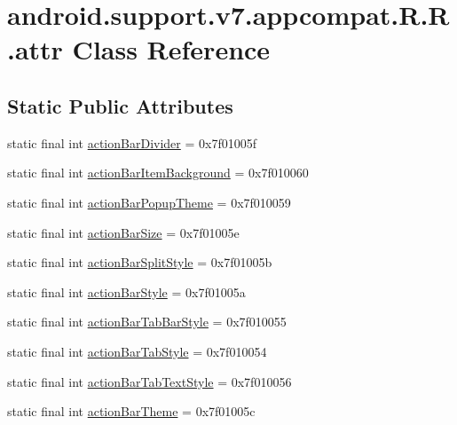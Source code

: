 \hypertarget{classandroid_1_1support_1_1v7_1_1appcompat_1_1_r_1_1attr}{
\section{android.support.v7.appcompat.R.R.attr Class Reference}
\label{classandroid_1_1support_1_1v7_1_1appcompat_1_1_r_1_1attr}
}
\subsection*{Static Public Attributes}
\begin{CompactItemize}
\item 
static final int \hyperlink{classandroid_1_1support_1_1v7_1_1appcompat_1_1_r_1_1attr_c9199392bf3e36a0efdac1749c98882b}{actionBarDivider} = 0x7f01005f
\item 
static final int \hyperlink{classandroid_1_1support_1_1v7_1_1appcompat_1_1_r_1_1attr_18dd256ffcbb8cb9cb1e1d4b12f641cd}{actionBarItemBackground} = 0x7f010060
\item 
static final int \hyperlink{classandroid_1_1support_1_1v7_1_1appcompat_1_1_r_1_1attr_ffa44a4704fa606d7877e29c8dbd414b}{actionBarPopupTheme} = 0x7f010059
\item 
static final int \hyperlink{classandroid_1_1support_1_1v7_1_1appcompat_1_1_r_1_1attr_4575ded4c31b964c573874acfc8f6499}{actionBarSize} = 0x7f01005e
\item 
static final int \hyperlink{classandroid_1_1support_1_1v7_1_1appcompat_1_1_r_1_1attr_5c6ad6330937b0baaf37523df3ca56a1}{actionBarSplitStyle} = 0x7f01005b
\item 
static final int \hyperlink{classandroid_1_1support_1_1v7_1_1appcompat_1_1_r_1_1attr_c9b9e6deb4dd4ae6671fbf7b442cc838}{actionBarStyle} = 0x7f01005a
\item 
static final int \hyperlink{classandroid_1_1support_1_1v7_1_1appcompat_1_1_r_1_1attr_cb6a203259f74a11b5b425e3879d09b9}{actionBarTabBarStyle} = 0x7f010055
\item 
static final int \hyperlink{classandroid_1_1support_1_1v7_1_1appcompat_1_1_r_1_1attr_fb280c0e0de0db9a1636ee632cd1b8b6}{actionBarTabStyle} = 0x7f010054
\item 
static final int \hyperlink{classandroid_1_1support_1_1v7_1_1appcompat_1_1_r_1_1attr_e7a9b18ca9c33888d942115a05faf1d9}{actionBarTabTextStyle} = 0x7f010056
\item 
static final int \hyperlink{classandroid_1_1support_1_1v7_1_1appcompat_1_1_r_1_1attr_f328426fd71f9d7d2ce8c0e00f24bade}{actionBarTheme} = 0x7f01005c

\end{CompactItemize}
